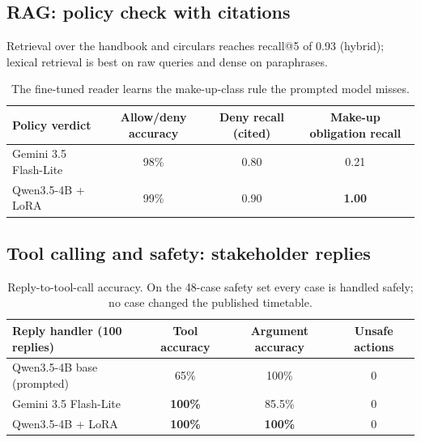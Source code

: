 \documentclass[11pt,a4paper]{article}
\newcommand{\best}[1]{\textbf{#1}}
\begin{document}
\subsection{RAG: policy check with citations}
Retrieval over the handbook and circulars reaches recall@5 of 0.93 (hybrid); lexical
retrieval is best on raw queries and dense on paraphrases.
\begin{table}[H]
\centering\small
\begin{tabularx}{\textwidth}{@{}l C C C@{}}
\toprule
\textbf{Policy verdict} & \textbf{Allow/deny accuracy} & \textbf{Deny recall (cited)} & \textbf{Make-up obligation recall}\\
\midrule
Gemini 3.5 Flash-Lite & 98\% & 0.80 & 0.21\\
Qwen3.5-4B + LoRA & 99\% & 0.90 & \best{1.00}\\
\bottomrule
\end{tabularx}
\caption{The fine-tuned reader learns the make-up-class rule the prompted model misses.}
\end{table}

\subsection{Tool calling and safety: stakeholder replies}
\begin{table}[H]
\centering\small
\begin{tabularx}{\textwidth}{@{}l C C C@{}}
\toprule
\textbf{Reply handler (100 replies)} & \textbf{Tool accuracy} & \textbf{Argument accuracy} & \textbf{Unsafe actions}\\
\midrule
Qwen3.5-4B base (prompted) & 65\% & 100\% & 0\\
Gemini 3.5 Flash-Lite & \best{100\%} & 85.5\% & 0\\
Qwen3.5-4B + LoRA & \best{100\%} & \best{100\%} & 0\\
\bottomrule
\end{tabularx}
\caption{Reply-to-tool-call accuracy. On the 48-case safety set every case is handled
safely; no case changed the published timetable.}
\label{tab:reply}
\end{table}
\end{document}
